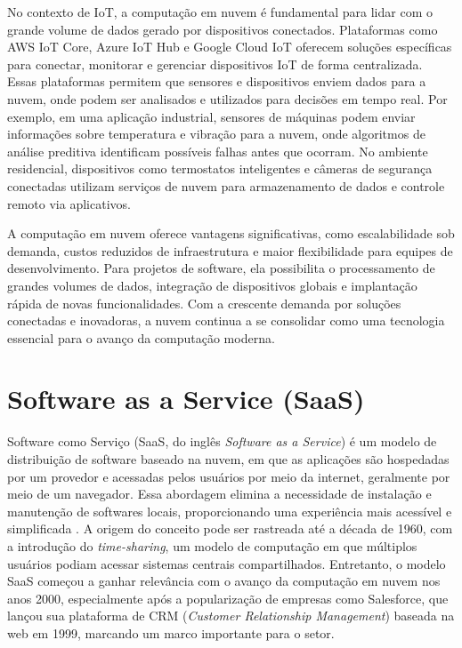 No contexto de IoT, a computação em nuvem é fundamental para lidar com o grande volume de dados gerado por dispositivos conectados. Plataformas como AWS IoT Core, Azure IoT Hub e Google Cloud IoT oferecem soluções específicas para conectar, monitorar e gerenciar dispositivos IoT de forma centralizada. Essas plataformas permitem que sensores e dispositivos enviem dados para a nuvem, onde podem ser analisados e utilizados para decisões em tempo real. Por exemplo, em uma aplicação industrial, sensores de máquinas podem enviar informações sobre temperatura e vibração para a nuvem, onde algoritmos de análise preditiva identificam possíveis falhas antes que ocorram. No ambiente residencial, dispositivos como termostatos inteligentes e câmeras de segurança conectadas utilizam serviços de nuvem para armazenamento de dados e controle remoto via aplicativos.

A computação em nuvem oferece vantagens significativas, como escalabilidade sob demanda, custos reduzidos de infraestrutura e maior flexibilidade para equipes de desenvolvimento. Para projetos de software, ela possibilita o processamento de grandes volumes de dados, integração de dispositivos globais e implantação rápida de novas funcionalidades. Com a crescente demanda por soluções conectadas e inovadoras, a nuvem continua a se consolidar como uma tecnologia essencial para o avanço da computação moderna.

\section{Software as a Service (SaaS)}

Software como Serviço (SaaS, do inglês \textit{Software as a Service}) é um modelo de distribuição de software baseado na nuvem, em que as aplicações são hospedadas por um provedor e acessadas pelos usuários por meio da internet, geralmente por meio de um navegador. Essa abordagem elimina a necessidade de instalação e manutenção de softwares locais, proporcionando uma experiência mais acessível e simplificada \cite{1236470}. A origem do conceito pode ser rastreada até a década de 1960, com a introdução do \textit{time-sharing}, um modelo de computação em que múltiplos usuários podiam acessar sistemas centrais compartilhados. Entretanto, o modelo SaaS começou a ganhar relevância com o avanço da computação em nuvem nos anos 2000, especialmente após a popularização de empresas como Salesforce, que lançou sua plataforma de CRM (\textit{Customer Relationship Management}) baseada na web em 1999, marcando um marco importante para o setor.

